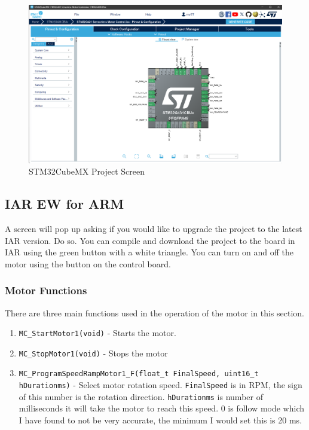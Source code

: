 \documentclass[10pt]{article}
\begin{document}
            \begin{figure}[H]
                \centerline{\includegraphics[width=\textwidth]{References/CubeMX.png}}
                \caption{STM32CubeMX Project Screen}
                    \end{figure}
		\FloatBarrier \subsection{IAR EW for ARM}
                    A screen will pop up asking if you would like to upgrade the project to the latest IAR version. Do so. You can compile and download the project to the board in IAR using the green button with a white triangle. You can turn on and off the motor using the button on the control board.
			\FloatBarrier \subsubsection{Motor Functions}
                        There are three main functions used in the operation of the motor in this section.
                        \begin{enumerate}
                            \item \texttt{MC\_StartMotor1(void)} - Starts the motor.
                            \item \texttt{MC\_StopMotor1(void)} - Stops the motor
                            \item \texttt{MC\_ProgramSpeedRampMotor1\_F(float\_t FinalSpeed, uint16\_t hDurationms)} - Select motor rotation speed. \texttt{FinalSpeed} is in RPM, the sign of this number is the rotation direction. \texttt{hDurationms} is number of milliseconds it will take the motor to reach this speed. 0 is follow mode which I have found to not be very accurate, the minimum I would set this is 20 ms.
                        \end{enumerate}
\end{document}
